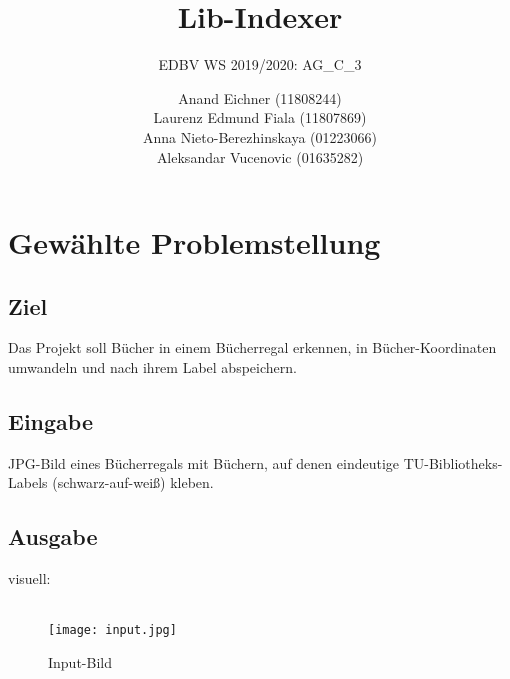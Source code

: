 \documentclass[paper=A4, deutsch]{scrartcl}
\begin{document}

\title{Lib-Indexer} %

\subtitle{EDBV WS 2019/2020: AG\_C\_3} %


\author{Anand Eichner (11808244)\\
Laurenz Edmund Fiala (11807869)\\
Anna Nieto-Berezhinskaya (01223066)\\
Aleksandar Vucenovic (01635282)}




\maketitle


\section{Gewählte Problemstellung}
\subsection{Ziel}
Das Projekt soll Bücher in einem Bücherregal erkennen, in Bücher-Koordinaten umwandeln und nach ihrem Label abspeichern.

\subsection{Eingabe}
JPG-Bild eines Bücherregals mit Büchern, auf denen eindeutige TU-Bibliotheks-Labels (schwarz-auf-weiß) kleben.

\subsection{Ausgabe}
visuell:\\
\\
\begin{figure}[H]
 \centering
 \texttt{[image: input.jpg]}
 \caption{Input-Bild}
 \label{fig:img}
\end{figure}
\end{document}
